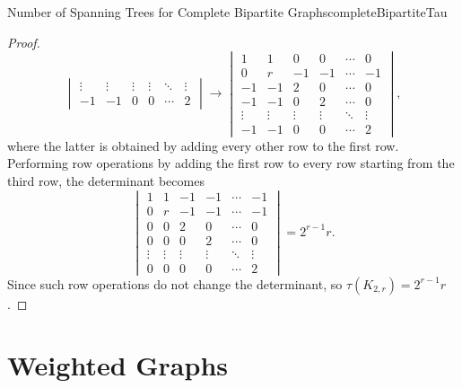 \documentclass[math]{amznotes}
\theoremstyle{remark}
\begin{document}
\begin{probox}{Number of Spanning Trees for Complete Bipartite Graphs}{completeBipartiteTau}
\begin{proof}
\begin{equation*}
\begin{vmatrix}
                \vdots & \vdots & \vdots & \vdots & \ddots & \vdots \\
                -1 & -1 & 0 & 0 & \cdots & 2
            \end{vmatrix} \longrightarrow \begin{vmatrix}
                1 & 1 & 0 & 0 & \cdots & 0 \\
                0 & r & -1 & -1 & \cdots & -1 \\
                -1 & -1 & 2 & 0 & \cdots & 0 \\
                -1 & -1 & 0 & 2 & \cdots & 0 \\
                \vdots & \vdots & \vdots & \vdots & \ddots & \vdots \\
                -1 & -1 & 0 & 0 & \cdots & 2
            \end{vmatrix},
        \end{equation*}
        where the latter is obtained by adding every other row to the first row. Performing row operations by adding the first row to every row starting from the third row, the determinant becomes
        \begin{equation*}
            \begin{vmatrix}
                1 & 1 & -1 & -1 & \cdots & -1 \\
                0 & r & -1 & -1 & \cdots & -1 \\
                0 & 0 & 2 & 0 & \cdots & 0 \\
                0 & 0 & 0 & 2 & \cdots & 0 \\
                \vdots & \vdots & \vdots & \vdots & \ddots & \vdots \\
                0 & 0 & 0 & 0 & \cdots & 2
            \end{vmatrix} = 2^{r - 1}r.
        \end{equation*}
        Since such row operations do not change the determinant, so $\tau(K_{2, r}) = 2^{r - 1}r$.
    \end{proof}
\end{probox}

\chapter{Weighted Graphs}
\end{document}
